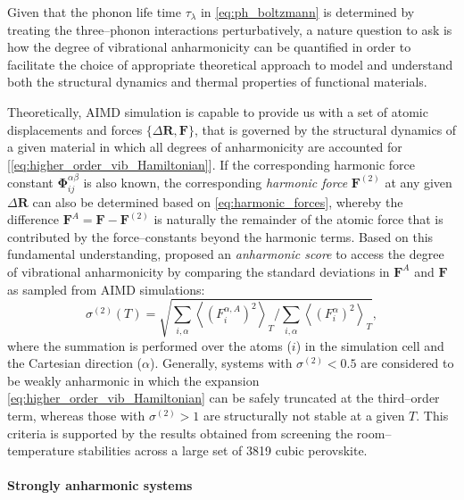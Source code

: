 Given that the phonon life time $\tau_\lambda$ in \cref{eq:ph_boltzmann} is determined by treating the three--phonon interactions perturbatively, a nature question to ask is how the degree of vibrational anharmonicity can be quantified in order to facilitate the choice of appropriate theoretical approach to model and understand both the structural dynamics and thermal properties of functional materials.  

Theoretically, AIMD simulation is capable to provide us with a set of atomic displacements and forces $\{\Delta\bm{R},\bm{F}\}$, that is governed by  the structural dynamics of a given material in which  all degrees of anharmonicity are accounted for [\cref{eq:higher_order_vib_Hamiltonian}]. If the corresponding harmonic force constant $\bm{\Phi}_{ij}^{\alpha\beta}$ is also known, the corresponding \emph{harmonic force} $\bm{F}^{(2)}$ at any given $\Delta\bm{R}$ can also be determined based on \cref{eq:harmonic_forces}, whereby the difference $\bm{F}^{A}=\bm{F}-\bm{F}^{(2)}$ is naturally the remainder of the atomic force that is contributed by the force--constants beyond the harmonic terms. Based on this fundamental understanding, \citet{knoop2020anharmonicity} proposed an \emph{anharmonic score} to access the degree of vibrational anharmonicity by comparing the standard deviations in $\bm{F}^{A}$ and $\bm{F}$ as sampled from AIMD simulations:
\begin{equation}\label{eq:anharmonic_score}
    \sigma^{(2)}(T)=\sqrt{\sum_{i,\alpha}\left\langle \left(F^{\alpha,A}_{i}\right)^2 \right\rangle_{T}\Big/ \sum_{i,\alpha}\left\langle \left(F_{i}^{\alpha}\right)^2 \right\rangle_{T}},
\end{equation} 
where the summation is performed over the  atoms ($i$) in the simulation cell and the Cartesian direction ($\alpha$). Generally, systems with $\sigma^{(2)}<0.5$ are considered to be weakly anharmonic in which the expansion \cref{eq:higher_order_vib_Hamiltonian} can be safely truncated at the third--order term, whereas those with $\sigma^{(2)}>1$ are structurally not stable at a given $T$. This  criteria is supported by the results obtained from screening the room--temperature stabilities across a large set of 3819 cubic perovskite.\cite{yang2021altas}

\paragraph{\textbf{Strongly anharmonic systems}} 

